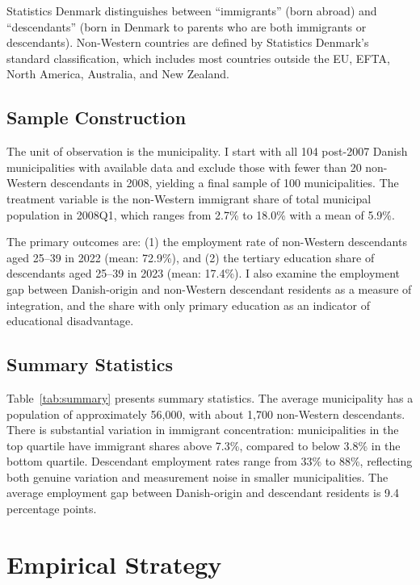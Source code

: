 \documentclass[12pt]{article}
\begin{document}
Statistics Denmark distinguishes between ``immigrants'' (born abroad) and ``descendants'' (born in Denmark to parents who are both immigrants or descendants). Non-Western countries are defined by Statistics Denmark's standard classification, which includes most countries outside the EU, EFTA, North America, Australia, and New Zealand.

\subsection{Sample Construction}

The unit of observation is the municipality. I start with all 104 post-2007 Danish municipalities with available data and exclude those with fewer than 20 non-Western descendants in 2008, yielding a final sample of 100 municipalities. The treatment variable is the non-Western immigrant share of total municipal population in 2008Q1, which ranges from 2.7\% to 18.0\% with a mean of 5.9\%.

The primary outcomes are: (1) the employment rate of non-Western descendants aged 25--39 in 2022 (mean: 72.9\%), and (2) the tertiary education share of descendants aged 25--39 in 2023 (mean: 17.4\%). I also examine the employment gap between Danish-origin and non-Western descendant residents as a measure of integration, and the share with only primary education as an indicator of educational disadvantage.

\subsection{Summary Statistics}



Table~\ref{tab:summary} presents summary statistics. The average municipality has a population of approximately 56,000, with about 1,700 non-Western descendants. There is substantial variation in immigrant concentration: municipalities in the top quartile have immigrant shares above 7.3\%, compared to below 3.8\% in the bottom quartile. Descendant employment rates range from 33\% to 88\%, reflecting both genuine variation and measurement noise in smaller municipalities. The average employment gap between Danish-origin and descendant residents is 9.4 percentage points.

\section{Empirical Strategy}
\end{document}
